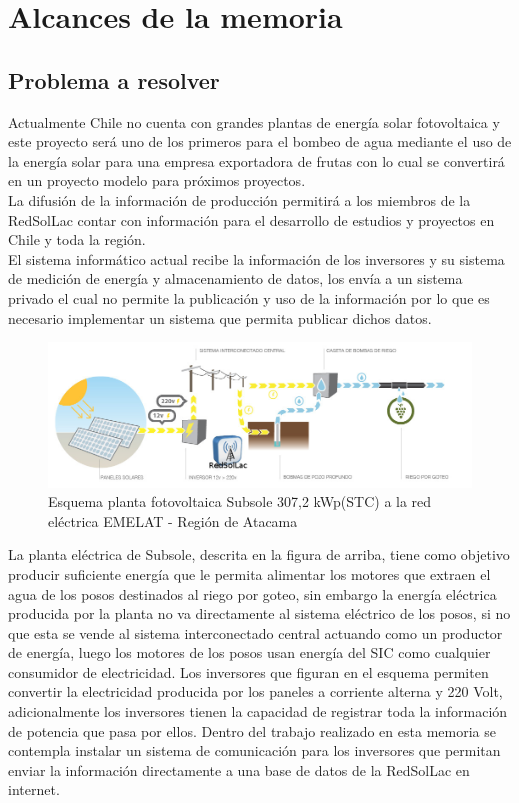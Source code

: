 \chapter{Alcances de la memoria}
\label{alcansces}

\section{Problema a resolver}

Actualmente Chile no cuenta con grandes plantas de energía solar fotovoltaica y este proyecto será uno de los primeros para el bombeo de agua mediante el uso de la energía solar para una empresa exportadora de frutas con lo cual se convertirá en un proyecto modelo para próximos proyectos.\\

La difusión de la información de producción permitirá a los miembros de la RedSolLac contar con información para el desarrollo de estudios y proyectos en Chile y toda la región.\\

El sistema informático actual recibe la información de los inversores y su sistema de medición de energía y almacenamiento de datos, los envía a un sistema privado el cual no permite la publicación y uso de la información por lo que es necesario implementar un sistema que permita publicar dichos datos.\\

\begin{figure}[h!]
        \centering
        \includegraphics[scale=0.4]{images/plantaSubSoleEsquema}
        \caption{\tiny Esquema planta fotovoltaica Subsole 307,2 kWp(STC) a la red eléctrica EMELAT - Región de Atacama}
\end{figure}

La planta eléctrica de Subsole, descrita en la figura de arriba, tiene como objetivo producir suficiente energía que le permita alimentar los motores que extraen el agua de los posos destinados al riego por goteo, sin embargo la energía eléctrica producida por la planta no va directamente al sistema eléctrico de los posos, si no que esta se vende al sistema interconectado central actuando como un productor de energía, luego los motores de los posos usan energía del SIC como cualquier consumidor de electricidad. Los inversores que figuran en el esquema permiten convertir la electricidad producida por los paneles a corriente alterna y 220 Volt, adicionalmente los inversores tienen la capacidad de registrar toda la información de potencia que pasa por ellos. Dentro del trabajo realizado en esta memoria se contempla instalar un sistema de comunicación para los inversores que permitan enviar la información directamente a una base de datos de la RedSolLac en internet.

